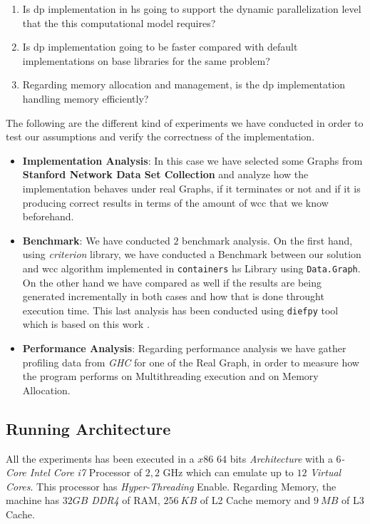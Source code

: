 \documentclass[preprint]{elsarticle}
\begin{document}
\begin{enumerate}[Q1.]\label{res:question}
    \item Is \acrshort{dp} implementation in \acrshort{hs} going to support the dynamic parallelization level that the this computational model requires?
    \item Is \acrshort{dp} implementation going to be faster compared with default implementations on base libraries for the same problem?
    \item Regarding memory allocation and management, is the \acrshort{dp} implementation handling memory efficiently?
\end{enumerate}

The following are the different kind of experiments we have conducted in order to test our assumptions and verify the correctness of the implementation.

\begin{itemize}
  \item \textbf{Implementation Analysis}: In this case we have selected some Graphs from \textbf{Stanford Network Data Set Collection} \cite{stanford} and analyze how the implementation
  behaves under real Graphs, if it terminates or not and if it is producing correct results in terms of the amount of \acrshort{wcc} that we know beforehand.
  \item \textbf{Benchmark}: We have conducted $2$ benchmark analysis. On the first hand, using \textit{criterion} \citep{criterion} library, we have conducted a Benchmark between our solution and \acrshort{wcc} algorithm implemented in \texttt{containers} \acrshort{hs} Library \cite{containers} using \texttt{Data.Graph}. On the other hand we have compared as well if the results are being generated incrementally in both cases and how that is done throught execution time. This last analysis has been conducted using \texttt{diefpy} tool \cite{diefpy} which is based on this work \cite{diefpaper}.
  \item \textbf{Performance Analysis}: Regarding performance analysis we have gather profiling data from \textit{GHC} for one of the Real Graph, in order to measure how the program performs on Multithreading execution and 
  on Memory Allocation.
\end{itemize}

\subsection{Running Architecture}
All the experiments has been executed in a $x86$ $64$ bits \emph{Architecture} with a \textit{$6$-Core Intel Core i7} Processor of $2,2$ GHz which can emulate up to $12$ \textit{Virtual Cores}. This processor has \emph{Hyper-Threading} Enable.
Regarding Memory, the machine has $32 GB$ \emph{DDR4} of RAM, $256\ KB$ of L2 Cache memory and $9\ MB$ of L3 Cache.
\end{document}
